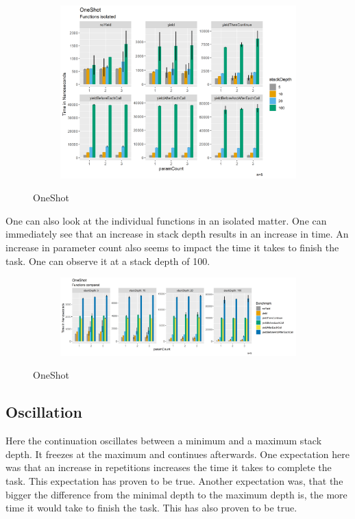 \begin{figure}[H]
  \centering
  \begin{subfigure}[b]{1.0\textwidth}
    \includegraphics[width=1.0\linewidth]{img/jmh/OneShot.png}
  \end{subfigure}
  \caption{OneShot}
\end{figure}

One can also look at the individual functions in an isolated matter. One can immediately see that an increase in stack depth results in an increase in time. An increase in parameter count also seems to impact the time it takes to finish the task. One can observe it at a stack depth of 100.


\begin{figure}[H]
  \centering
  \begin{subfigure}[b]{1.0\textwidth}
    \includegraphics[width=1.0\linewidth]{img/jmh/OneShot2.png}
  \end{subfigure}
  \caption{OneShot}
\end{figure}





\subsection{Oscillation}
Here the continuation oscillates between a minimum and a maximum stack depth. It freezes at the maximum and continues afterwards.
One expectation here was that an increase in repetitions increases the time it takes to complete the task. This expectation has proven to be true. Another expectation was, that the bigger the difference from the minimal depth to the maximum depth is, the more time it would take to finish the task. This has also proven to be true.

